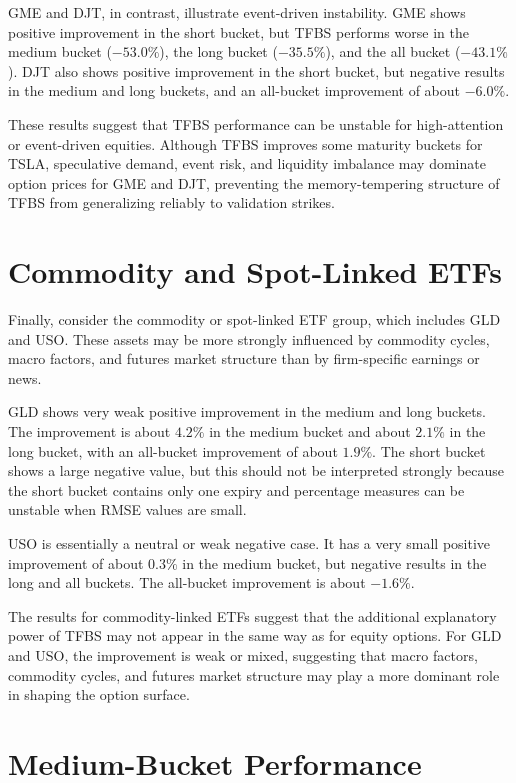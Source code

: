 \documentclass[11pt,a4paper]{report}
\begin{document}
GME and DJT, in contrast, illustrate event-driven instability. GME shows positive improvement in the short bucket, but TFBS performs worse in the medium bucket ($-53.0\%$), the long bucket ($-35.5\%$), and the all bucket ($-43.1\%$). DJT also shows positive improvement in the short bucket, but negative results in the medium and long buckets, and an all-bucket improvement of about $-6.0\%$.

These results suggest that TFBS performance can be unstable for high-attention or event-driven equities. Although TFBS improves some maturity buckets for TSLA, speculative demand, event risk, and liquidity imbalance may dominate option prices for GME and DJT, preventing the memory-tempering structure of TFBS from generalizing reliably to validation strikes.

\section{Commodity and Spot-Linked ETFs}

Finally, consider the commodity or spot-linked ETF group, which includes GLD and USO. These assets may be more strongly influenced by commodity cycles, macro factors, and futures market structure than by firm-specific earnings or news.

GLD shows very weak positive improvement in the medium and long buckets. The improvement is about $4.2\%$ in the medium bucket and about $2.1\%$ in the long bucket, with an all-bucket improvement of about $1.9\%$. The short bucket shows a large negative value, but this should not be interpreted strongly because the short bucket contains only one expiry and percentage measures can be unstable when RMSE values are small.

USO is essentially a neutral or weak negative case. It has a very small positive improvement of about $0.3\%$ in the medium bucket, but negative results in the long and all buckets. The all-bucket improvement is about $-1.6\%$.

The results for commodity-linked ETFs suggest that the additional explanatory power of TFBS may not appear in the same way as for equity options. For GLD and USO, the improvement is weak or mixed, suggesting that macro factors, commodity cycles, and futures market structure may play a more dominant role in shaping the option surface.

\section{Medium-Bucket Performance}
\end{document}
